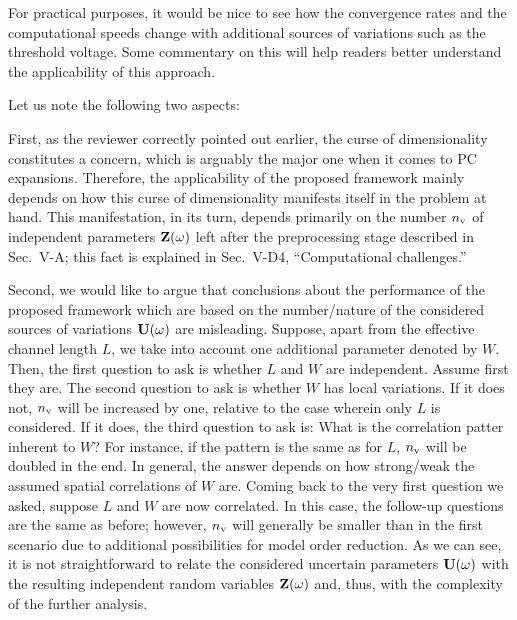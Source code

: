 \begin{reviewer}
For practical purposes, it would be nice to see how the convergence rates and the computational speeds change with additional sources of variations such as the threshold voltage. Some commentary on this will help readers better understand the applicability of this approach.
\end{reviewer}
\begin{authors}
Let us note the following two aspects:

First, as the reviewer correctly pointed out earlier, the curse of dimensionality constitutes a concern, which is arguably the major one when it comes to PC expansions.
Therefore, the applicability of the proposed framework mainly depends on how this curse of dimensionality manifests itself in the problem at hand.
This manifestation, in its turn, depends primarily on the number ${n_\text{v}}$ of independent parameters $\mathbf{Z}(\omega)$ left after the preprocessing stage described in Sec.~V-A; this fact is explained in Sec.~V-D4, ``Computational challenges.''

Second, we would like to argue that conclusions about the performance of the proposed framework which are based on the number/nature of the considered sources of variations $\mathbf{U}(\omega)$ are misleading.
Suppose, apart from the effective channel length $L$, we take into account one additional parameter denoted by $W$.
Then, the first question to ask is whether $L$ and $W$ are independent.
Assume first they are.
The second question to ask is whether $W$ has local variations.
If it does not, ${n_\text{v}}$ will be increased by one, relative to the case wherein only $L$ is considered.
If it does, the third question to ask is: What is the correlation patter inherent to $W$?
For instance, if the pattern is the same as for $L$, ${n_\text{v}}$ will be doubled in the end.
In general, the answer depends on how strong/weak the assumed spatial correlations of $W$ are.
Coming back to the very first question we asked, suppose $L$ and $W$ are now correlated.
In this case, the follow-up questions are the same as before; however, ${n_\text{v}}$ will generally be smaller than in the first scenario due to additional possibilities for model order reduction.
As we can see, it is not straightforward to relate the considered uncertain parameters $\mathbf{U}(\omega)$ with the resulting independent random variables $\mathbf{Z}(\omega)$ and, thus, with the complexity of the further analysis.


\end{authors}
